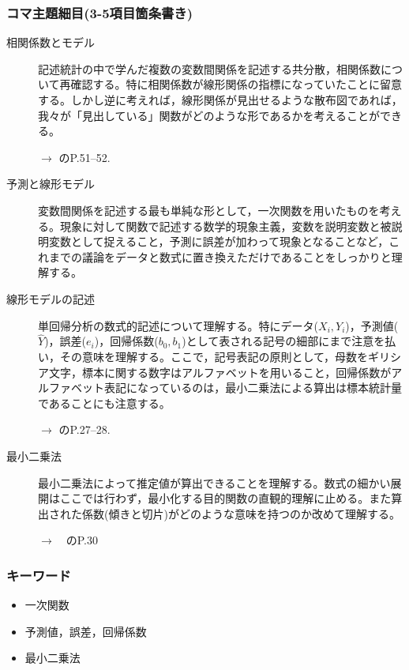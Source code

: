 \subsubsection{コマ主題細目(3-5項目箇条書き)}
\begin{description}
\item[相関係数とモデル]記述統計の中で学んだ複数の変数間関係を記述する共分散，相関係数について再確認する。特に相関係数が線形関係の指標になっていたことに留意する。しかし逆に考えれば，線形関係が見出せるような散布図であれば，我々が「見出している」関数がどのような形であるかを考えることができる。
\begin{flushright}
    $\to$ \citet{kosugi2018}のP.51--52.
\end{flushright}

\item[予測と線形モデル]変数間関係を記述する最も単純な形として，一次関数を用いたものを考える。現象に対して関数で記述する数学的現象主義，変数を説明変数と被説明変数として捉えること，予測に誤差が加わって現象となることなど，これまでの議論をデータと数式に置き換えただけであることをしっかりと理解する。

\item[線形モデルの記述]単回帰分析の数式的記述について理解する。特にデータ($X_i,Y_i$)，予測値($\hat{Y}$)，誤差($e_i$)，回帰係数($b_0,b_1$)として表される記号の細部にまで注意を払い，その意味を理解する。ここで，記号表記の原則として，母数をギリシア文字，標本に関する数字はアルファベットを用いること，回帰係数がアルファベット表記になっているのは，最小二乗法による算出は標本統計量であることにも注意する。
\begin{flushright}
    $\to$ \citet{豊田201706}のP.27--28.
\end{flushright}

\item[最小二乗法]最小二乗法によって推定値が算出できることを理解する。数式の細かい展開はここでは行わず，最小化する目的関数の直観的理解に止める。また算出された係数(傾きと切片)がどのような意味を持つのか改めて理解する。
\begin{flushright}
    $\to$　\citet{豊田201706}のP.30
\end{flushright}

\end{description}
\subsubsection{キーワード}
\begin{itemize}
\item 一次関数
\item 予測値，誤差，回帰係数
\item 最小二乗法
\end{itemize}
